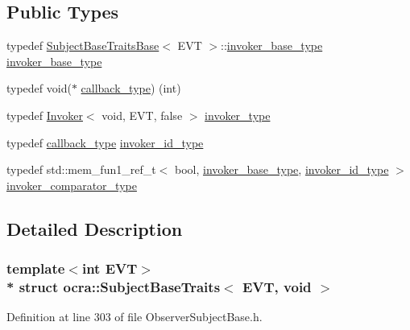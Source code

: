 \subsection*{Public Types}
\begin{DoxyCompactItemize}
\item 
typedef \hyperlink{structocra_1_1SubjectBaseTraitsBase}{Subject\+Base\+Traits\+Base}$<$ E\+VT $>$\+::\hyperlink{structocra_1_1SubjectBaseTraitsBase_a439671662c8f8f3e80e6675f008dec3f}{invoker\+\_\+base\+\_\+type} \hyperlink{structocra_1_1SubjectBaseTraits_3_01EVT_00_01void_01_4_a28d0e1b20cde0e239218e2ef724502b1}{invoker\+\_\+base\+\_\+type}
\item 
typedef void($\ast$ \hyperlink{structocra_1_1SubjectBaseTraits_3_01EVT_00_01void_01_4_a805e01034816edb44ee4269aba6c5beb}{callback\+\_\+type}) (int)
\item 
typedef \hyperlink{classocra_1_1Invoker}{Invoker}$<$ void, E\+VT, false $>$ \hyperlink{structocra_1_1SubjectBaseTraits_3_01EVT_00_01void_01_4_af6c08a6cdc4753f4246a8eebaf73152c}{invoker\+\_\+type}
\item 
typedef \hyperlink{structocra_1_1SubjectBaseTraits_3_01EVT_00_01void_01_4_a805e01034816edb44ee4269aba6c5beb}{callback\+\_\+type} \hyperlink{structocra_1_1SubjectBaseTraits_3_01EVT_00_01void_01_4_a35ce9f06a9f2a9e766ad2fb892283d08}{invoker\+\_\+id\+\_\+type}
\item 
typedef std\+::mem\+\_\+fun1\+\_\+ref\+\_\+t$<$ bool, \hyperlink{structocra_1_1SubjectBaseTraitsBase_a439671662c8f8f3e80e6675f008dec3f}{invoker\+\_\+base\+\_\+type}, \hyperlink{structocra_1_1SubjectBaseTraits_3_01EVT_00_01void_01_4_a35ce9f06a9f2a9e766ad2fb892283d08}{invoker\+\_\+id\+\_\+type} $>$ \hyperlink{structocra_1_1SubjectBaseTraits_3_01EVT_00_01void_01_4_a1103b087174cb0f6e007f554c214c4d4}{invoker\+\_\+comparator\+\_\+type}
\end{DoxyCompactItemize}


\subsection{Detailed Description}
\subsubsection*{template$<$int E\+VT$>$\\*
struct ocra\+::\+Subject\+Base\+Traits$<$ E\+V\+T, void $>$}



Definition at line 303 of file Observer\+Subject\+Base.\+h.



